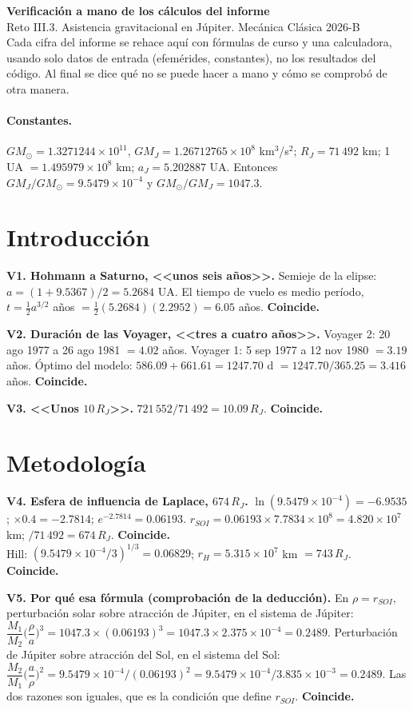 \documentclass[11pt,letterpaper]{article}
\newcommand{\RJ}{R_J}\newcommand{\vinf}{v_\infty}
\newcommand{\ok}{\textbf{Coincide.}\ }
\begin{document}
{\LARGE\bfseries Verificación a mano de los cálculos del informe}\\[2pt]
Reto III.3. Asistencia gravitacional en Júpiter. Mecánica Clásica 2026-B\\
\small Cada cifra del informe se rehace aquí con fórmulas de curso y una calculadora, usando solo datos de entrada (efemérides, constantes), no los resultados del código. Al final se dice qué no se puede hacer a mano y cómo se comprobó de otra manera.

\paragraph{Constantes.} $GM_\odot=1.3271244\times10^{11}$, $GM_J=1.26712765\times10^{8}$ km$^3$/s$^2$; $\RJ=71\,492$ km; 1 UA $=1.495979\times10^8$ km; $a_J=5.202887$ UA. Entonces $GM_J/GM_\odot=9.5479\times10^{-4}$ y $GM_\odot/GM_J=1047.3$.

\section{Introducción}
\textbf{V1. Hohmann a Saturno, <<unos seis años>>.} Semieje de la elipse: $a=(1+9.5367)/2=5.2684$ UA. El tiempo de vuelo es medio período, $t=\tfrac12a^{3/2}$ años $=\tfrac12(5.2684)(2.2952)=6.05$ años. \ok

\textbf{V2. Duración de las Voyager, <<tres a cuatro años>>.} Voyager 2: 20 ago 1977 a 26 ago 1981 $=4.02$ años. Voyager 1: 5 sep 1977 a 12 nov 1980 $=3.19$ años. Óptimo del modelo: $586.09+661.61=1247.70$ d $=1247.70/365.25=3.416$ años. \ok

\textbf{V3. <<Unos $10\,R_J$>>.} $721\,552/71\,492=10.09\,R_J$. \ok

\section{Metodología}
\textbf{V4. Esfera de influencia de Laplace, $674\,R_J$.} $\ln(9.5479\times10^{-4})=-6.9535$; $\times0.4=-2.7814$; $e^{-2.7814}=0.06193$. $r_{SOI}=0.06193\times7.7834\times10^8=4.820\times10^7$ km; $/71\,492=674\,R_J$. \ok\\
Hill: $(9.5479\times10^{-4}/3)^{1/3}=0.06829$; $r_H=5.315\times10^7$ km $=743\,R_J$. \ok

\textbf{V5. Por qué esa fórmula (comprobación de la deducción).} En $\rho=r_{SOI}$, perturbación solar sobre atracción de Júpiter, en el sistema de Júpiter: $\dfrac{M_1}{M_2}\Big(\dfrac\rho a\Big)^3=1047.3\times(0.06193)^3=1047.3\times2.375\times10^{-4}=0.2489$. Perturbación de Júpiter sobre atracción del Sol, en el sistema del Sol: $\dfrac{M_2}{M_1}\Big(\dfrac a\rho\Big)^2=9.5479\times10^{-4}/(0.06193)^2=9.5479\times10^{-4}/3.835\times10^{-3}=0.2489$. Las dos razones son iguales, que es la condición que define $r_{SOI}$. \ok
\end{document}
